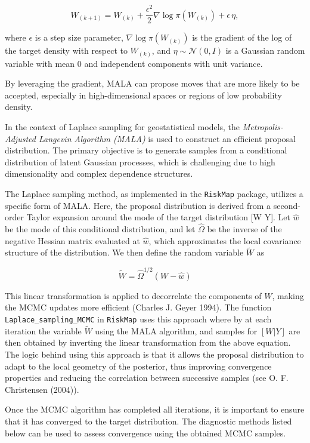 \documentclass[
  letterpaper,
]{krantz}
\begin{document}
\[
W_{(k+1)} = W_{(k)} + \frac{\epsilon^2}{2} \nabla \log \pi(W_{(k)}) + \epsilon \, \eta,
\]

where \(\epsilon\) is a step size parameter,
\(\nabla \log \pi(W_{(k)})\) is the gradient of the log of the target
density with respect to \(W_{(k)}\), and \(\eta \sim \mathcal{N}(0, I)\)
is a Gaussian random variable with mean 0 and independent components
with unit variance.

By leveraging the gradient, MALA can propose moves that are more likely
to be accepted, especially in high-dimensional spaces or regions of low
probability density.

In the context of Laplace sampling for geostatistical models, the
\textit{Metropolis-Adjusted Langevin Algorithm (MALA)} is used to
construct an efficient proposal distribution. The primary objective is
to generate samples from a conditional distribution of latent Gaussian
processes, which is challenging due to high dimensionality and complex
dependence structures.

The Laplace sampling method, as implemented in the \texttt{RiskMap}
package, utilizes a specific form of MALA. Here, the proposal
distribution is derived from a second-order Taylor expansion around the
mode of the target distribution {[}W \textbar{} Y{]}. Let \(\hat{w}\) be
the mode of this conditional distribution, and let \(\hat{\Omega}\) be
the inverse of the negative Hessian matrix evaluated at \(\hat{w}\),
which approximates the local covariance structure of the distribution.
We then define the random variable \(\tilde{W}\) as

\[
\tilde{W} = \hat{\Omega}^{1/2} (W - \hat{w})
\]

This linear transformation is applied to decorrelate the components of
\(W\), making the MCMC updates more efficient (Charles J. Geyer 1994).
The function \texttt{Laplace\_sampling\_MCMC} in \texttt{RiskMap} uses
this approach where by at each iteration the variable \(\tilde{W}\)
using the MALA algorithm, and samples for \([W | Y]\) are then obtained
by inverting the linear transformation from the above equation. The
logic behind using this approach is that it allows the proposal
distribution to adapt to the local geometry of the posterior, thus
improving convergence properties and reducing the correlation between
successive samples (see O. F. Christensen (2004)).

Once the MCMC algorithm has completed all iterations, it is important to
ensure that it has converged to the target distribution. The diagnostic
methods listed below can be used to assess convergence using the
obtained MCMC samples.
\end{document}
